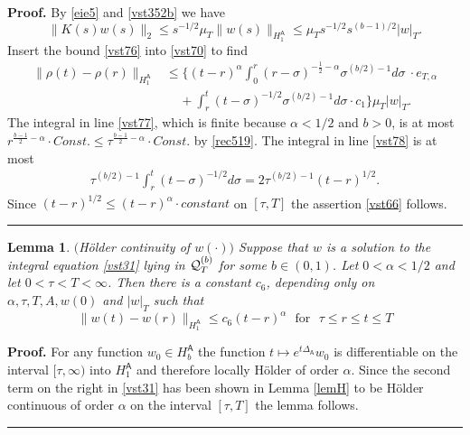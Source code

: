 \documentclass[12pt]{article}
\newtheorem{lemma}[theorem]{Lemma}
\newenvironment{proof}[1][Proof]{\textbf{#1.} }{\ \rule{0.5em}{0.5em}}
\def \As{\mathsf{A}}
\def \Q{{\cal Q}}
\def \beq{\begin{equation}}
\def \eeq{\end{equation}}
\def \eref{\eqref}
\numberwithin{equation}{section}
\begin{document}
\begin{proof}
 By \eref{eie5} and \eref{vst352b}  we have
\beq
\|K(s) w(s)\|_2 \le   s^{-1/2} \mu_T \|w(s)\|_{H_1^\As} \le \mu_T s^{-1/2} s^{(b-1)/2} |w|_T.   
 \label{vst76}
\eeq
Insert the bound \eref{vst76} into \eref{vst70} to find
\begin{align}
  \| \rho(t) - \rho(r)\|_{H_1^\As} & \le  \Big\{(t-r)^{\alpha}  \int_0^r 
               (r-\sigma)^{- \frac{1}{2} -\alpha}    \sigma^{(b/2) -1}
               d\sigma\ \cdot  e_{T, \alpha}                                      \label{vst77}\\
&\ \ \ \ \ +\int_r^t    (t-\sigma)^{-1/2}\sigma^{(b/2) -1} 
d\sigma \cdot c_1\Big\}  \mu_T |w|_T.                                     \label{vst78}
         \end{align}
          The  integral in line \eref{vst77}, which  is finite because $\alpha < 1/2$ and $b >0$,  is at most 
          $r^{\frac{b-1}{2} - \alpha}\cdot Const. \le \tau^{\frac{b-1}{2} - \alpha}\cdot Const.$  by \eref{rec519}. 
The integral in line \eref{vst78} is at most
\begin{align}
\tau^{(b/2) -1} \int_r^t (t-\sigma)^{-1/2} d\sigma = 2\tau^{(b/2) -1} (t-r)^{1/2}.
\end{align}
Since $(t-r)^{1/2} \le (t-r)^\alpha \cdot constant$  
  on $[\tau, T]$ 
the assertion \eref{vst66} follows.
\end{proof}


\begin{lemma}\label{lemholdw} $($H\"older continuity of $w(\cdot)$$)$ Suppose that $w$ is
 a solution to the integral equation \eref{vst31} lying in $\Q_T^{(b)}$ for some $b \in (0, 1)$. Let
$0<\alpha <1/2$   and let $0< \tau < T < \infty$. Then  there is a constant $c_6$, depending only
 on $\alpha, \tau, T, A, w(0)$     
   and $| w|_T$  such that
\beq
\| w(t) - w(r)\|_{H_1^\As} \le c_6 (t-r)^{\alpha}\ \ \ \text{for}\ \ \  \tau \le r \le t \le T     \label{vst79}
\eeq
\end{lemma}
         \begin{proof} For any function $w_0 \in H_b^\As$
         the function $t\mapsto e^{t\Delta_\As} w_0$ is differentiable on
          the interval $[\tau,\infty)$ into $H_1^\As$
         and therefore locally H\"older of order $\alpha$. 
         Since the second term on the right in \eref{vst31} 
         has been shown in Lemma \ref{lemH}  to be H\"older continuous of order $\alpha$ 
         on the interval $[\tau,T]$ the lemma follows.      
\end{proof}
\end{document}
